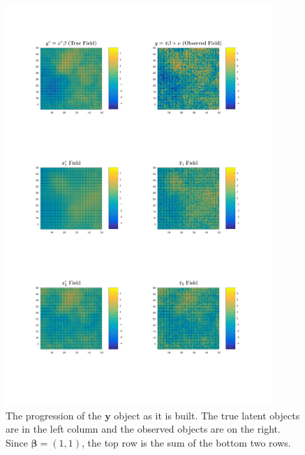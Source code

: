 \documentclass[12pt]{article}
\def\*#1{\bm{#1}}
\begin{document}
\begin{figure}[htbp]
\begin{center}
\includegraphics[width=0.9\textwidth]{figures/yprogression.png}
\caption{The progression of the $\*y$ object as it is built. The true latent objects are in the left column and the observed objects are on the right. Since $\*\beta = (1,1)$, the top row is the sum of the bottom two rows.}
\label{fig:yfield}
\end{center}
\end{figure}


\newpage



\end{document}
